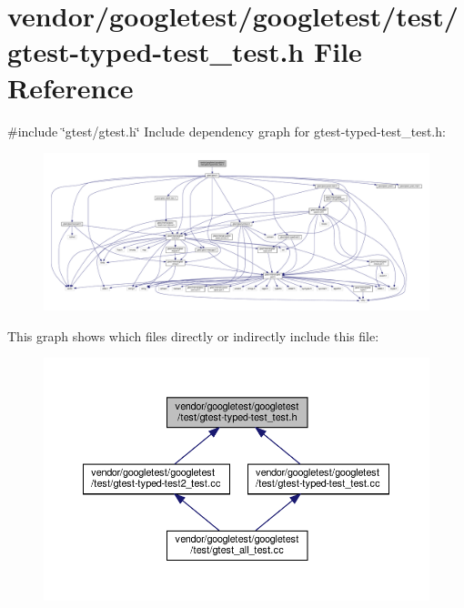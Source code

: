 \hypertarget{gtest-typed-test__test_8h}{}\section{vendor/googletest/googletest/test/gtest-\/typed-\/test\+\_\+test.h File Reference}
\label{gtest-typed-test__test_8h}
{\ttfamily \#include \char`\"{}gtest/gtest.\+h\char`\"{}}\newline
Include dependency graph for gtest-\/typed-\/test\+\_\+test.h\+:
\nopagebreak
\begin{figure}[H]
\begin{center}
\leavevmode
\includegraphics[width=350pt]{gtest-typed-test__test_8h__incl}
\end{center}
\end{figure}
This graph shows which files directly or indirectly include this file\+:
\nopagebreak
\begin{figure}[H]
\begin{center}
\leavevmode
\includegraphics[width=350pt]{gtest-typed-test__test_8h__dep__incl}
\end{center}
\end{figure}
